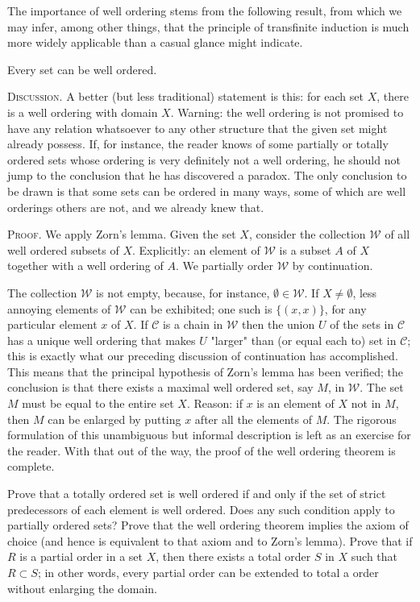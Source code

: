 The importance of well ordering stems from the following result, from which we may infer, among other things, that the principle of transfinite induction is much more widely applicable than a casual glance might indicate. 

\begin{named} Every set can be well ordered. 
\end{named}

\textsc{Discussion}. A better (but less traditional) statement is this: for each set $X$, there is a well ordering with domain $X$. Warning: the well ordering is not promised to have any relation whatsoever to any other structure that the given set might already possess. If, for instance, the reader knows of some partially or totally ordered sets whose ordering is very definitely not a well ordering, he should not jump to the conclusion that he has discovered a paradox. The only conclusion to be drawn is that some sets can be ordered in many ways, some of which are well orderings others are not, and we already knew that. 

\textsc{Proof}. We apply Zorn's lemma. Given the set $X$, consider the collection $\mathcal{W}$ of all well ordered subsets of $X$. Explicitly: an element of $\mathcal{W}$ is a subset $A$ of $X$ together with a well ordering of $A$. We partially order $\mathcal{W}$ by continuation. 

The collection $\mathcal{W}$ is not empty, because, for instance, $\emptyset \in \mathcal{W}$. If $X \neq \emptyset$, less annoying elements of $\mathcal{W}$ can be exhibited; one such is $\{ (x,x) \}$, for any particular element $x$ of $X$. If $\mathcal{C}$ is a chain in $\mathcal{W}$ then the union $U$ of the sets in $\mathcal{C}$ has a unique well ordering that makes $U$ "larger" than (or equal each to) set in $\mathcal{C}$; this is exactly what our preceding discussion of continuation has accomplished. This means that the principal hypothesis of Zorn's lemma has been verified; the conclusion is that there exists a maximal well ordered set, say $M$, in $\mathcal{W}$. The set $M$ must be equal to the entire set $X$. Reason: if $x$ is an element of $X$ not in $M$, then $M$ can be enlarged by putting $x$ after all the elements of $M$. The rigorous formulation of this unambiguous but informal description is left as an exercise for the reader. With that out of the way, the proof of the well ordering theorem is complete. 

\begin{exercise}[Exercise. ] Prove that a totally ordered set is well ordered if and only if the set of strict predecessors of each element is well ordered. Does any such condition apply to partially ordered sets? Prove that the well ordering theorem implies the axiom of choice (and hence is equivalent to that axiom and to Zorn's lemma). Prove that if $R$ is a partial order in a set $X$, then there exists a total order $S$ in $X$ such that $R \subset S$; in other words, every partial order can be extended to total a order without enlarging the domain.
\end{exercise}